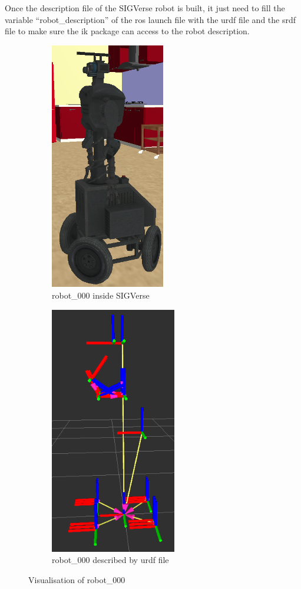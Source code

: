 Once the description file of the SIGVerse robot is built, it just need to fill the variable ``robot\_description'' of the ros launch file with the urdf file and the srdf file to make sure the ik package can access to the robot description.\\

\begin{figure}
\centering
\begin{subfigure}{.5\textwidth}
  \centering
  \includegraphics[width=50mm]{images/robot_000_sigverse.png}
  \caption{robot\_000 inside SIGVerse}
  \label{fig:robotSig}
\end{subfigure}%
\begin{subfigure}{.5\textwidth}
  \centering
  \includegraphics[width=55mm]{images/robot_000_rviz.png}
  \caption{robot\_000 described by urdf file}
  \label{fig:robotRviz}
\end{subfigure}
\caption{Visualisation of robot\_000}
\label{fig:robotVisu}
\end{figure}

